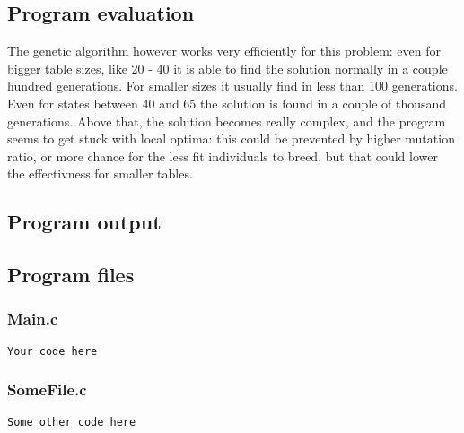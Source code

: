 \documentclass{article}
\begin{document}
\subsection*{Program evaluation}
The genetic algorithm however works very efficiently for this problem: even for bigger table sizes, like 20 - 40 it is able to find the solution normally in a couple hundred generations. For smaller sizes it usually find in less than 100 generations. Even for states between 40 and 65 the solution is found in a couple of thousand generations. Above that, the solution becomes really complex, and the program seems to get stuck with local optima: this could be prevented by higher mutation ratio, or more chance for the less fit individuals to breed, but that could lower the effectivness for smaller tables.

\subsection*{Program output}


\subsection*{Program files}
\subsubsection*{Main.c}
\begin{lstlisting}
Your code here
\end{lstlisting}

\subsubsection*{SomeFile.c}
\begin{lstlisting}
Some other code here
\end{lstlisting}
\end{document}
